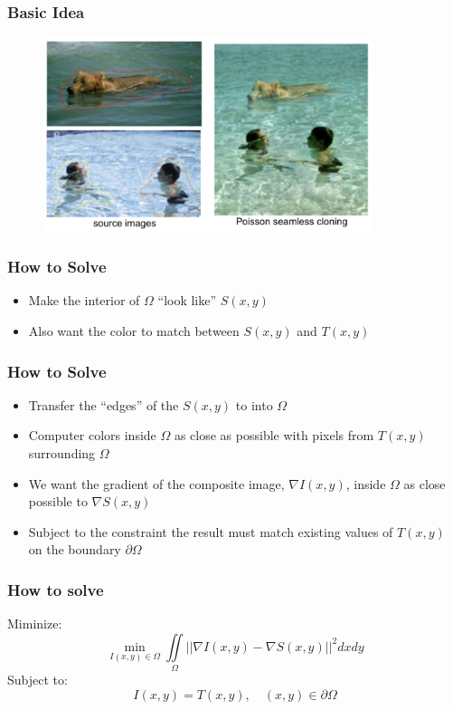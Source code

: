 \documentclass{beamer}
\begin{document}
\begin{frame}
    \frametitle{Basic Idea}
    \begin{figure}[!ht]
        \centering
        \includegraphics[width=3.8in]{resource/possion_cloning_2.png}        
    \end{figure}
\end{frame}

\begin{frame}
    \frametitle{How to Solve}
    \begin{itemize}
        \item Make the interior of $\Omega$ ``look like'' $S(x,y)$ 
        \item Also want the color to match between $S(x,y)$ and  $T(x,y)$        
    \end{itemize}    
\end{frame}

\begin{frame}
    \frametitle{How to Solve}
    \begin{itemize}
        \item Transfer the ``edges'' of the $S(x,y)$ to into $\Omega$
        \item Computer colors inside $\Omega$ as close as possible with pixels from $T(x,y)$ surrounding $\Omega$
        \item We want the gradient of the composite image, $\nabla I(x,y)$, inside $\Omega$ as close possible to $\nabla S(x,y)$
        \item Subject to the constraint the result must match existing values of $T(x,y)$ on the boundary $\partial \Omega$
    \end{itemize}    
\end{frame}

\begin{frame}
    \frametitle{How to solve}
    Miminize:
    \begin{equation} 
        \label{eq:1}
        \min_{I(x,y) \in \Omega} \iint \limits_{\Omega} ||\nabla I(x,y) - \nabla S(x,y) ||^{2}dxdy        
    \end{equation}
    Subject to:
    \begin{equation}
        \label{eq:2}
        I(x,y) = T(x,y), \quad (x,y) \in \partial \Omega        
    \end{equation}
\end{frame}
\end{document}
